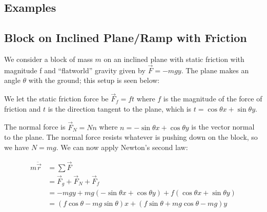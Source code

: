 \documentclass[main.tex]{subfiles}
\begin{document}
\begin{appendices}
\chapter{Examples}

\section{Block on Inclined Plane/Ramp with Friction}

We consider a block of mass $m$ on an inclined plane with static friction with magnitude
f and ``flatworld'' gravity  given by $\vec{F}  = -mg\unit{y}$. The plane makes an angle
$\theta$ with the ground; this setup is seen below:

\begin{figure}[h]
\label{fig: block-ramp}
\end{figure}

We let the static friction force be $\vec{F}_f = f \unit{t}$ where $f$ is the magnitude
of the force of friction and $\unit{t}$ is the direction tangent to the plane, which is
$\unit{t} = \cos \theta \unit{x} + \sin \theta \unit{y}$.

The normal force is $\vec{F}_N = N \unit{n}$ where $\unit{n} = - \sin \theta \unit{x} +
\cos \theta \unit{y}$ is the vector normal to the plane. The normal force resists whatever
is pushing down on the block, so we have $N = mg$. We can now apply Newton's second
law:

\begin{align*}
m \ddot{\vec{r}} &= \sum \vec{F} \\
&= \vec{F}_g + \vec{F}_N + \vec{F}_f \\
&= -mg\unit{y} + mg \left(- \sin \theta \unit{x} + \cos \theta \unit{y} \right) + f \left(
\cos \theta \unit{x} + \sin \theta \unit{y} \right) \\
&= \left( f \cos \theta - mg \sin \theta \right) \unit{x} + \left( f \sin \theta + mg \cos
\theta - mg \right) \unit{y}
\end{align*}


\end{appendices}
\end{document}
